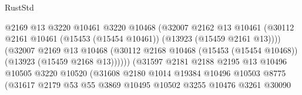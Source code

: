 \begin{lexlean}{RustStd}
\begin{coremodule}
                                          @2169
                                          @13
                                          @3220
                                          @10461
                                          @3220
                                          @10468
                                          (@32007
                                            @2162
                                            @13
                                            @10461
                                            (@30112
                                              @2161
                                              @10461
                                              (@15453 (@15454 @10461))
                                              (@13923 (@15459 @2161 @13))))
                                          (@32007
                                            @2169
                                            @13
                                            @10468
                                            (@30112
                                              @2168
                                              @10468
                                              (@15453 (@15454 @10468))
                                              (@13923 (@15459 @2168 @13))))))
                                      (@31597
                                        @2181
                                        @2188
                                        @2195
                                        @13
                                        @10496
                                        @10505
                                        @3220
                                        @10520
                                        (@31608
                                          @2180
                                          @1014
                                          @19384
                                          @10496
                                          @10503
                                          @8775
                                          (@31617
                                            @2179
                                            @53
                                            @55
                                            @3869
                                            @10495
                                            @10502
                                            @3255
                                            @10476
                                            @3261
                                            @30090

\end{coremodule}
\end{lexlean}
